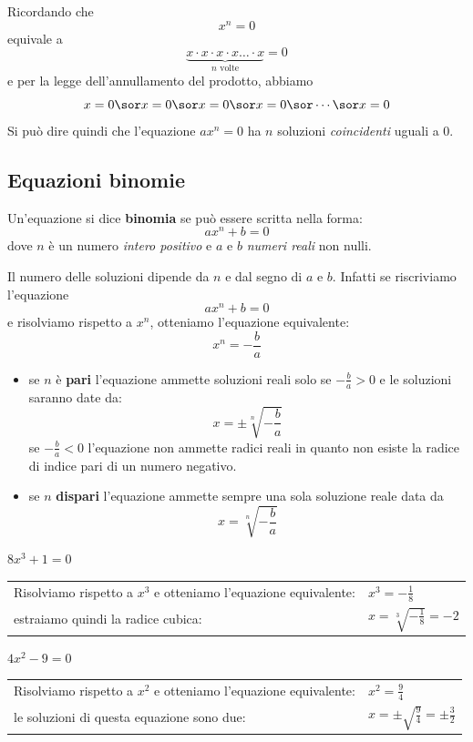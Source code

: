 Ricordando che $$x^n=0$$
equivale a $$\underbrace{x\cdot x\cdot x\cdot x \dots \cdot x}_{\text{$n$ 
volte}}=0$$
e per la legge dell'annullamento del prodotto, abbiamo $$x=0 \sor x=0 
\sor x=0 \sor x=0 \sor \cdots \sor x=0 $$
Si può dire quindi che l'equazione $ax^n=0$ ha $n$ soluzioni 
\emph{coincidenti} uguali a 0.

\subsection{Equazioni binomie}

\begin{definizione}
Un'equazione si dice \textbf{binomia} se può essere scritta nella forma:
$$ax^n+b=0$$
dove $n$ è un numero \emph{intero positivo} e $a$ e $b$  \emph{numeri 
reali}  non nulli.  
\end{definizione}

Il numero delle soluzioni dipende da $n$ e dal segno di $a$ e $b$.
Infatti se riscriviamo l'equazione
$$ax^n+b=0$$
e risolviamo rispetto a $x^n$, otteniamo l'equazione equivalente:
$$x^n=-\frac{b}{a}$$

\begin{itemize}
\item se $n$ è \textbf{pari} l'equazione ammette soluzioni reali 
solo se  $-\frac{b}{a}>0$ e le soluzioni saranno date da:
$$x=\pm \sqrt[n]{-\frac{b}{a}}$$
se $-\frac{b}{a}<0$ l'equazione non ammette radici reali in 
quanto non esiste la radice di indice pari di un numero negativo.
\item se $n$ \textbf{dispari} l'equazione ammette sempre 
una sola soluzione reale data da  $$x= \sqrt[n]{-\frac{b}{a}}$$ 
\end{itemize}

\begin{esempio}
$8x^3+1=0$
\begin{center}
\begin{tabular}{ll}
Risolviamo rispetto a $x^3$ e otteniamo l'equazione equivalente: & 
$x^3=-\frac{1}{8}$\\
estraiamo quindi la radice cubica: & $x=\sqrt[3]{-\frac{1}{8}} = -2$
\end{tabular}
\end{center}
\end{esempio}

\begin{esempio}
$4x^2-9=0$
\begin{center}
\begin{tabular}{ll}
Risolviamo rispetto a $x^2$ e otteniamo l'equazione equivalente: & 
$x^2=\frac{9}{4}$\\
le soluzioni di questa equazione sono due: & 
$x=\pm \sqrt{\frac{9}{4}}=\pm\frac{3}{2}$
\end{tabular}
\end{center}
\end{esempio}    


